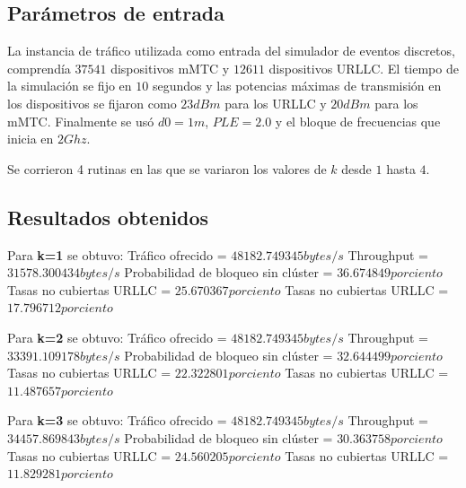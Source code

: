 \subsection{Parámetros de entrada}

La instancia de tráfico utilizada como entrada del simulador de eventos discretos, comprendía $37541$ dispositivos mMTC y $12611$ dispositivos URLLC. El tiempo de la simulación se fijo en $10$ segundos y las potencias máximas de transmisión en los dispositivos se fijaron como $23dBm$ para los URLLC y $20dBm$ para los mMTC. Finalmente se usó $d0=1m$, $PLE=2.0$ y el bloque de frecuencias que inicia en $2Ghz$. 

Se corrieron 4 rutinas en las que se variaron los valores de $k$ desde $1$ hasta $4$.

\subsection{Resultados obtenidos}

Para \textbf{k=1} se obtuvo:\newline
Tráfico ofrecido = $48182.749345 bytes/s$ \newline
Throughput = $31578.300434 bytes/s$ \newline
Probabilidad de bloqueo sin clúster = $36.674849 porciento$ \newline
Tasas no cubiertas URLLC = $25.670367 porciento$ \newline
Tasas no cubiertas URLLC = $17.796712 porciento$ \newline

Para \textbf{k=2} se obtuvo:\newline
Tráfico ofrecido = $48182.749345 bytes/s$ \newline
Throughput = $33391.109178 bytes/s$ \newline
Probabilidad de bloqueo sin clúster = $32.644499 porciento$ \newline
Tasas no cubiertas URLLC = $22.322801 porciento$ \newline
Tasas no cubiertas URLLC = $11.487657 porciento$ \newline

Para \textbf{k=3} se obtuvo:\newline
Tráfico ofrecido = $48182.749345 bytes/s$ \newline
Throughput = $34457.869843 bytes/s$ \newline
Probabilidad de bloqueo sin clúster = $30.363758 porciento$ \newline
Tasas no cubiertas URLLC = $24.560205 porciento$ \newline
Tasas no cubiertas URLLC = $11.829281 porciento$ \newline

